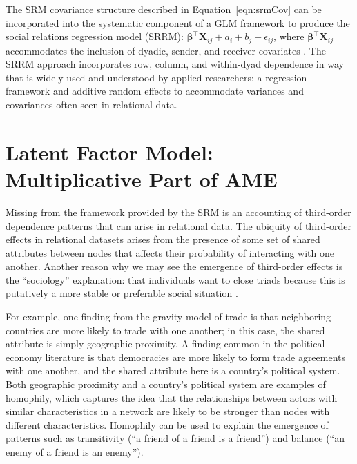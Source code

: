 \documentclass[9pt,twocolumn,twoside,lineno]{pnas-new}
\begin{document}
The SRM covariance structure described in Equation~\ref{eqn:srmCov} can be incorporated into the systematic component of a GLM framework to produce the social relations regression model (SRRM): $\bm\beta^{\top} \mathbf{X}_{ij} + a_{i} + b_{j} + \epsilon_{ij}$, where $ \bm\beta^{\top} \mathbf{X}_{ij}$ accommodates the inclusion of dyadic, sender, and receiver covariates \citep{hoff:2005}. The SRRM approach incorporates row, column, and within-dyad dependence in way that is widely used and understood by applied researchers: a regression framework and additive random effects to accommodate variances and covariances often seen in relational data.%

\section*{Latent Factor Model: Multiplicative Part of AME}

Missing from the framework provided by the SRM is an accounting of third-order dependence patterns that can arise in relational data. The ubiquity of third-order effects in relational datasets arises from the presence of some set of shared attributes between nodes that affects their probability of interacting with one another. Another reason why we may see the emergence of third-order effects is the ``sociology'' explanation: that individuals want to close triads because this is putatively a more stable or preferable social situation \citep{wasserman:faust:1994}.

For example, one finding from the gravity model of trade is that neighboring countries are more likely to trade with one another; in this case, the shared attribute is simply geographic proximity. A finding common in the political economy literature is that democracies are more likely to form trade agreements with one another, and the shared attribute here is a country's political system. Both geographic proximity and a country's political system are examples of homophily, which captures the idea that the relationships between actors with similar characteristics in a network are likely to be stronger than nodes with different characteristics. Homophily can be used to explain the emergence of patterns such as transitivity (``a friend of a friend is a friend'') and balance (``an enemy of a friend is an enemy''). 
\end{document}
